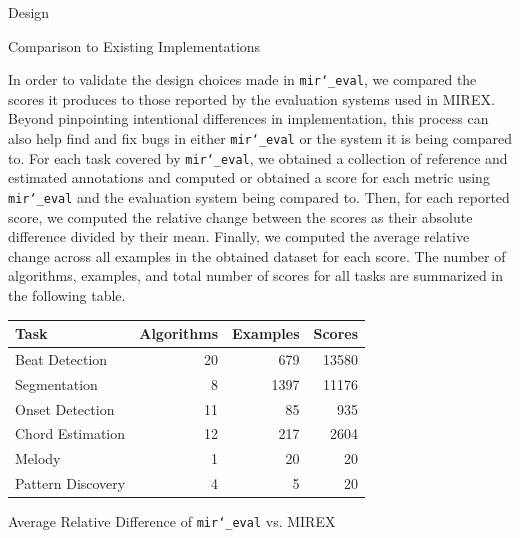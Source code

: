 \documentclass[paperwidth=120cm,paperheight=150cm,portrait,fontscale=.22,margin=5cm,lmargin=.2cm,rmargin=.2cm]{baposter}
\def\mireval{\texttt{mir\char`_eval}}
\begin{document}
\begin{poster}
\begin{posterbox}[column=0,below=auto]{Design}
\end{posterbox}

\begin{posterbox}[column=1]{Comparison to Existing Implementations}


In order to validate the design choices made in \mireval{}, we compared the scores it produces to those reported by the evaluation systems used in MIREX.
Beyond pinpointing intentional differences in implementation, this process can also help find and fix bugs in either \mireval{} or the system it is being compared to.
For each task covered by \mireval{}, we obtained a collection of reference and estimated annotations and computed or obtained a score for each metric using \mireval{} and the evaluation system being compared to.
Then, for each reported score, we computed the relative change between the scores as their absolute difference divided by their mean.
Finally, we computed the average relative change across all examples in the obtained dataset for each score.
The number of algorithms, examples, and total number of scores for all tasks are summarized in the following table.

\begin{center}
\begin{tabular}{l r r r}
\toprule
Task & Algorithms & Examples & Scores\\
\midrule
Beat Detection & 20 & 679 & 13580\\
Segmentation & 8 & 1397 & 11176 \\
Onset Detection & 11 & 85 & 935 \\
Chord Estimation & 12 & 217 & 2604 \\
Melody & 1 & 20 & 20 \\
Pattern Discovery & 4 & 5 & 20 \\
\bottomrule
\end{tabular}
\end{center}

\vspace{-2.5mm}

\end{posterbox}

\begin{posterbox}[column=0,below=auto,span=2]{Average Relative Difference of \mireval{} vs. MIREX}


\end{posterbox}
\end{poster}
\end{document}
